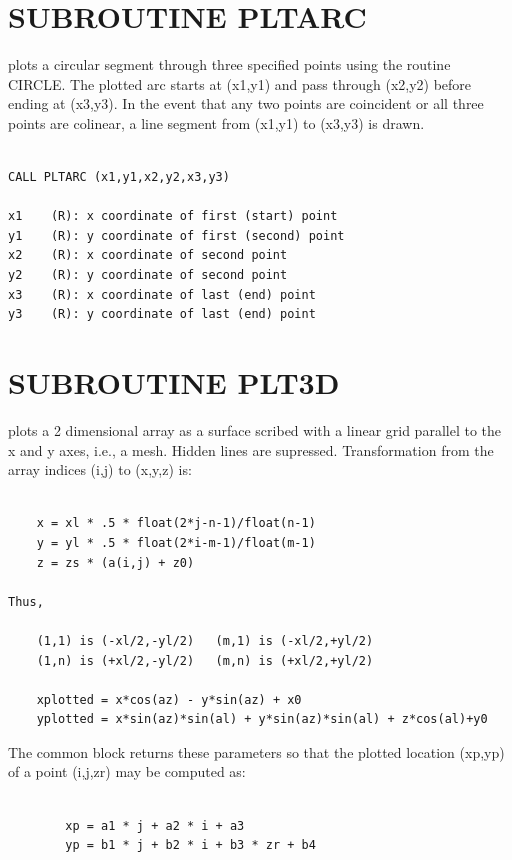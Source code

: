 \documentclass[11pt]{report}
\begin{document}
\section{SUBROUTINE PLTARC}

 plots a circular  segment through three specified points
using the routine CIRCLE.  The plotted arc starts at (x1,y1) and
pass through (x2,y2) before ending at (x3,y3).  In the event that any
two points are coincident or all three points are colinear, a line
segment from (x1,y1) to (x3,y3) is drawn.
\begin{verbatim}

CALL PLTARC (x1,y1,x2,y2,x3,y3)

x1    (R): x coordinate of first (start) point
y1    (R): y coordinate of first (second) point
x2    (R): x coordinate of second point
y2    (R): y coordinate of second point
x3    (R): x coordinate of last (end) point
y3    (R): y coordinate of last (end) point
\end{verbatim}

\section{SUBROUTINE PLT3D}

 plots a 2 dimensional array as a surface scribed with a linear grid
parallel to the x and y axes, i.e., a mesh.  Hidden lines are supressed.
Transformation from the array indices (i,j) to (x,y,z) is:
\begin{verbatim}

    x = xl * .5 * float(2*j-n-1)/float(n-1)
    y = yl * .5 * float(2*i-m-1)/float(m-1)
    z = zs * (a(i,j) + z0)

Thus,

    (1,1) is (-xl/2,-yl/2)   (m,1) is (-xl/2,+yl/2)
    (1,n) is (+xl/2,-yl/2)   (m,n) is (+xl/2,+yl/2)

    xplotted = x*cos(az) - y*sin(az) + x0
    yplotted = x*sin(az)*sin(al) + y*sin(az)*sin(al) + z*cos(al)+y0
\end{verbatim}

The common block  returns these  parameters
so that the plotted location (xp,yp) of a point (i,j,zr) may be
computed as:
\begin{verbatim}

        xp = a1 * j + a2 * i + a3
        yp = b1 * j + b2 * i + b3 * zr + b4
\end{verbatim}
\end{document}
